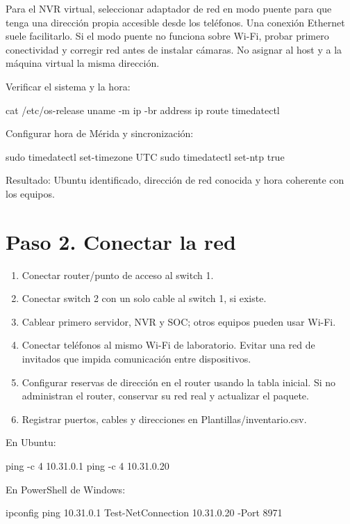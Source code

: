 \documentclass[12pt,a4paper]{article}
\begin{document}
Para el NVR virtual, seleccionar adaptador de red en modo puente para que tenga una dirección propia accesible desde los teléfonos. Una conexión Ethernet suele facilitarlo. Si el modo puente no funciona sobre Wi-Fi, probar primero conectividad y corregir red antes de instalar cámaras. No asignar al host y a la máquina virtual la misma dirección.\par
Verificar el sistema y la hora:\par
{}
\begin{Comandos}
cat /etc/os-release
uname -m
ip -br address
ip route
timedatectl
\end{Comandos}
Configurar hora de Mérida y sincronización:\par
{}
\begin{Comandos}
sudo timedatectl set-timezone UTC
sudo timedatectl set-ntp true
\end{Comandos}
Resultado: Ubuntu identificado, dirección de red conocida y hora coherente con los equipos.\par
{}\section*{Paso 2. Conectar la red}
\begin{enumerate}
\item Conectar router/punto de acceso al switch 1.
\item Conectar switch 2 con un solo cable al switch 1, si existe.
\item Cablear primero servidor, NVR y SOC; otros equipos pueden usar Wi-Fi.
\item Conectar teléfonos al mismo Wi-Fi de laboratorio. Evitar una red de invitados que impida comunicación entre dispositivos.
\item Configurar reservas de dirección en el router usando la tabla inicial. Si no administran el router, conservar su red real y actualizar el paquete.
\item Registrar puertos, cables y direcciones en \textnormal{Plantillas/\allowbreak{}inventario.csv}.
\end{enumerate}
En Ubuntu:\par
{}
\begin{Comandos}
ping -c 4 10.31.0.1
ping -c 4 10.31.0.20
\end{Comandos}
En PowerShell de Windows:\par
{}
\begin{Comandos}
ipconfig
ping 10.31.0.1
Test-NetConnection 10.31.0.20 -Port 8971
\end{Comandos}
\end{document}
